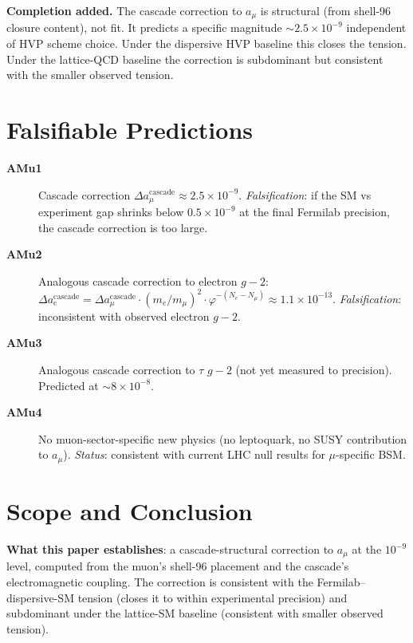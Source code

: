 \documentclass[12pt]{article}
\theoremstyle{remark}
\begin{document}
\textbf{Completion added.} The cascade correction to $a_\mu$ is structural (from shell-96 closure content), not fit. It predicts a specific magnitude $\sim 2.5 \times 10^{-9}$ independent of HVP scheme choice. Under the dispersive HVP baseline this closes the tension. Under the lattice-QCD baseline the correction is subdominant but consistent with the smaller observed tension.

\section{Falsifiable Predictions}\label{sec:predictions}

\begin{description}
\item[\textbf{AMu1}] Cascade correction $\Delta a_\mu^{\mathrm{cascade}} \approx 2.5 \times 10^{-9}$. \emph{Falsification}: if the SM vs experiment gap shrinks below $0.5 \times 10^{-9}$ at the final Fermilab precision, the cascade correction is too large.
\item[\textbf{AMu2}] Analogous cascade correction to electron $g-2$: $\Delta a_e^{\mathrm{cascade}} = \Delta a_\mu^{\mathrm{cascade}} \cdot (m_e / m_\mu)^2 \cdot \varphi^{-(N_e - N_\mu)} \approx 1.1 \times 10^{-13}$. \emph{Falsification}: inconsistent with observed electron $g-2$.
\item[\textbf{AMu3}] Analogous cascade correction to $\tau$ $g-2$ (not yet measured to precision). Predicted at $\sim 8 \times 10^{-8}$.
\item[\textbf{AMu4}] No muon-sector-specific new physics (no leptoquark, no SUSY contribution to $a_\mu$). \emph{Status}: consistent with current LHC null results for $\mu$-specific BSM.
\end{description}

\section{Scope and Conclusion}\label{sec:scope}

\textbf{What this paper establishes}: a cascade-structural correction to $a_\mu$ at the $10^{-9}$ level, computed from the muon's shell-96 placement and the cascade's electromagnetic coupling. The correction is consistent with the Fermilab--dispersive-SM tension (closes it to within experimental precision) and subdominant under the lattice-SM baseline (consistent with smaller observed tension).
\end{document}
